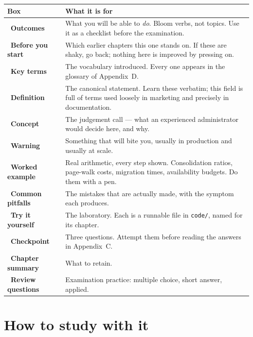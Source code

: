 \begin{longtable}{@{}L{4.6cm}L{10.6cm}@{}}
\toprule
{}
\textbf{Box} & \textbf{What it is for} \\
\midrule
\endhead
{}~\textbf{Outcomes} & What you will be able to \emph{do}. Bloom
verbs, not topics. Use it as a checklist before the examination. \\
~\textbf{Before you start} & Which earlier chapters this one stands
on. If these are shaky, go back; nothing here is improved by pressing on. \\
~\textbf{Key terms} & The vocabulary introduced. Every one appears
in the glossary of Appendix~D. \\
~\textbf{Definition} & The canonical statement. Learn these
verbatim; this field is full of terms used loosely in marketing and precisely in
documentation. \\
~\textbf{Concept} & The judgement call --- what an experienced
administrator would decide here, and why. \\
~\textbf{Warning} & Something that will bite you,
usually in production and usually at scale. \\
~\textbf{Worked example} & Real arithmetic, every step shown.
Consolidation ratios, page-walk costs, migration times, availability budgets.
Do them with a pen. \\
~\textbf{Common pitfalls} & The mistakes that are
actually made, with the symptom each produces. \\
~\textbf{Try it yourself} & The laboratory. Each is a runnable file
in \texttt{code/}, named for its chapter. \\
~\textbf{Checkpoint} & Three questions. Attempt them
before reading the answers in Appendix~C. \\
~\textbf{Chapter summary} & What to retain. \\
~\textbf{Review questions} & Examination practice: multiple
choice, short answer, applied. \\
\bottomrule
\end{longtable}

\section*{How to study with it}

